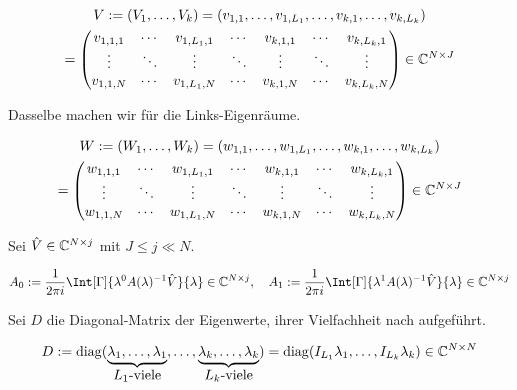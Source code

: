 \begin{multline*}
    V
    :=
    (V_1, \dots, V_k)
    =
    (v_{1, 1}, \dots, v_{1, L_1}, \dots, v_{k, 1}, \dots, v_{k, L_k}) \\
    =
    \begin{pmatrix}
        v_{1, 1, 1} & \cdots & v_{1, L_1, 1} & \cdots & v_{k, 1, 1} & \cdots & v_{k, L_k, 1} \\
        \vdots      & \ddots & \vdots        & \ddots & \vdots      & \ddots & \vdots        \\
        v_{1, 1, N} & \cdots & v_{1, L_1, N} & \cdots & v_{k, 1, N} & \cdots & v_{k, L_k, N}
    \end{pmatrix}
    \in
    \mathbb{C}^{N \times J}
\end{multline*}

Dasselbe machen wir für die Links-Eigenräume.

\begin{multline*}
    W
    :=
    (W_1, \dots, W_k)
    =
    (w_{1, 1}, \dots, w_{1, L_1}, \dots, w_{k, 1}, \dots, w_{k, L_k}) \\
    =
    \begin{pmatrix}
        w_{1, 1, 1} & \cdots & w_{1, L_1, 1} & \cdots & w_{k, 1, 1} & \cdots & w_{k, L_k, 1} \\
        \vdots      & \ddots & \vdots        & \ddots & \vdots      & \ddots & \vdots        \\
        w_{1, 1, N} & \cdots & w_{1, L_1, N} & \cdots & w_{k, 1, N} & \cdots & w_{k, L_k, N}
    \end{pmatrix}
    \in
    \mathbb{C}^{N \times J}
\end{multline*}

Sei $\hat V \in \mathbb{C}^{N \times j}$ mit $J \leq j \ll N$.

\begin{align} \label{eq:integral_matrizen}
    A_0 := \frac{1}{2 \pi i} \Int[\Gamma]{\lambda^0 A(\lambda)^{-1} \hat V}{\lambda} \in \C^{N \times j},
    \quad
    A_1 := \frac{1}{2 \pi i} \Int[\Gamma]{\lambda^1 A(\lambda)^{-1} \hat V}{\lambda} \in \C^{N \times j}
\end{align}

Sei $D$ die Diagonal-Matrix der Eigenwerte, ihrer Vielfachheit nach aufgeführt.

\begin{align*}
    D
    :=
    \operatorname{diag}
    (
        \underbrace
        {
            \lambda_1, \dots, \lambda_1
        }_{
            \displaystyle
            \text{$L_1$-viele}
        },
        \dots,
        \underbrace
        {
            \lambda_k, \dots, \lambda_k
        }_{
            \displaystyle
            \text{$L_k$-viele}
        }
    )
    =
    \operatorname{diag}(I_{L_1} \lambda_1, \dots, I_{L_k} \lambda_k)
    \in
    \mathbb{C}^{N \times N}
\end{align*}

